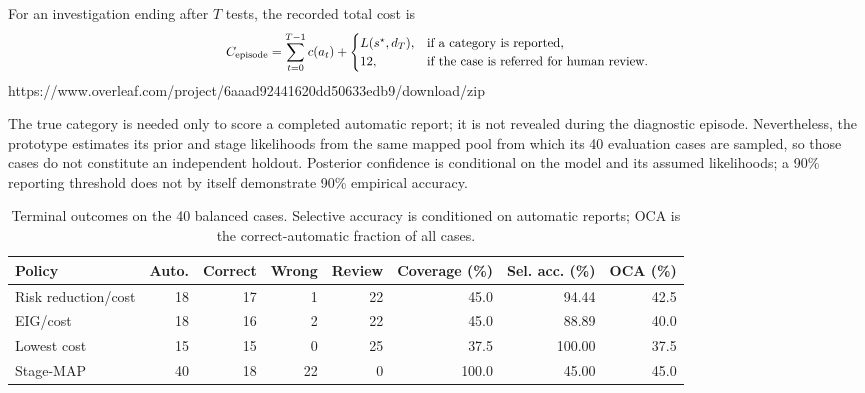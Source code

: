 \documentclass{article}
\begin{document}
For an investigation ending after $T$ tests, the recorded total cost is
\begin{equation}
\resizebox{0.88\columnwidth}{!}{$\displaystyle
C_{\mathrm{episode}}=
\sum_{t=0}^{T-1}c(a_t)+
\begin{cases}
L(s^\star,d_T), & \text{if a category is reported},\\
12, & \text{if the case is referred for human review}.
\end{cases}
$}
\label{eq:prob_episode_cost}
\end{equation}https://www.overleaf.com/project/6aaad92441620dd50633edb9/download/zip

The true category is needed only to score a completed automatic report;
it is not revealed during the diagnostic episode. Nevertheless, the
prototype estimates its prior and stage likelihoods from the same mapped
pool from which its 40 evaluation cases are sampled, so those cases do not
constitute an independent holdout. Posterior confidence is conditional on
the model and its assumed likelihoods; a 90\% reporting threshold does not
by itself demonstrate 90\% empirical accuracy.

\begin{table}[!b]
\renewcommand{\arraystretch}{1.2}
\centering
\caption{Terminal outcomes on the 40 balanced cases. Selective accuracy is
conditioned on automatic reports; OCA is the correct-automatic fraction of all
cases.}
\label{tab:decision_results}
\footnotesize
\begin{tabular*}{\textwidth}{@{\extracolsep{\fill}}lrrrrrrr@{}}
\toprule
Policy & Auto. & Correct & Wrong & Review & Coverage (\%) &
Sel. acc. (\%) & OCA (\%) \\
\midrule
Risk reduction/cost & 18 & 17 & 1  & 22 & 45.0  & 94.44 & 42.5 \\
EIG/cost            & 18 & 16 & 2  & 22 & 45.0  & 88.89 & 40.0 \\
Lowest cost         & 15 & 15 & 0  & 25 & 37.5  & 100.00 & 37.5 \\
Stage-MAP           & 40 & 18 & 22 & 0  & 100.0 & 45.00 & 45.0 \\
\bottomrule
\end{tabular*}
\end{table}
\end{document}
